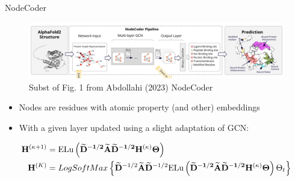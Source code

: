 \documentclass{beamer}
\newcommand{\NodeRepMat}{\mathbf{H}}
\newcommand{\DegMat}{\mathbf{D}}
\newcommand{\iter}{\kappa}
\newcommand{\Iter}{K}
\newcommand{\AdjMat}{\mathbf{A}}
\begin{document}
    
\begin{frame}{NodeCoder}
    \begin{figure}
        \centering 
        \includegraphics[scale=0.3]{Fig1_NodeCoder.png}
        \caption{Subst of Fig. 1 from Abdollahi (2023) NodeCoder \cite{abdollahi_nodecoder_2023}}
    \end{figure}

    \begin{itemize}
        \item Nodes are residues with atomic property (and other) embeddings
        \item With a given layer updated using a slight adaptation of GCN: 
    \end{itemize}
    \begin{align*}
        \NodeRepMat^{(\iter+1)} 
        &=
        \text{ELu}
        \left( 
            \mathbf{
            \widetilde{\DegMat}^{-1/2}
            \widetilde{\AdjMat}
            \widetilde{\DegMat}^{-1/2}  
            \NodeRepMat^{(\iter)}
            \Theta 
            }            
        \right)
    \\
        \NodeRepMat^{(\Iter)} 
        &=
        LogSoftMax
        \left\{
        \widetilde{\DegMat}^{-1/2}
        \widetilde{\AdjMat}
        \widetilde{\DegMat}^{-1/2}  
        \text{ELu}
        \left( 
            \mathbf{
            \widetilde{\DegMat}^{-1/2}
            \widetilde{\AdjMat}
            \widetilde{\DegMat}^{-1/2}  
            \NodeRepMat^{(\iter)}
            \Theta 
            }            
        \right)
        \Theta_t
        \right\}
    \end{align*}
\end{frame}

\end{document}
